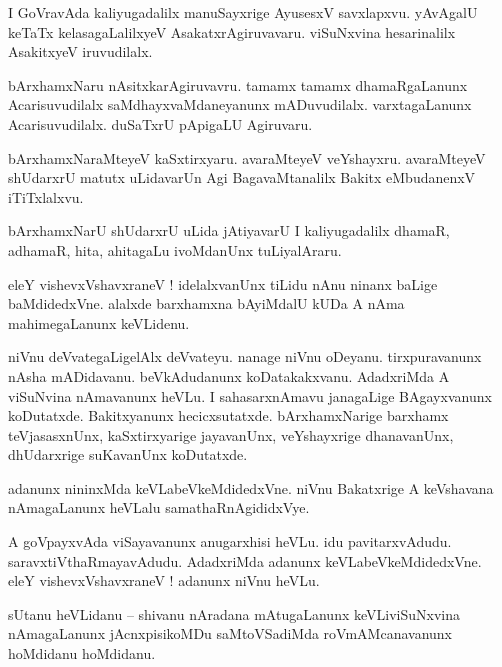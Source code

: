 \documentclass{article}
\begin{document}
\begin{mn}%
I GoVravAda kaliyugadalilx manuSayxrige AyusesxV savxlapxvu. yAvAgalU keTaTx kelasagaLalilxyeV 
AsakatxrAgiruvavaru. viSuNxvina hesarinalilx AsakitxyeV iruvudilalx.
\end{mn}

\begin{mn}%
bArxhamxNaru nAsitxkarAgiruvavru. tamamx tamamx dhamaRgaLanunx Acarisuvudilalx 
saMdhayxvaMdaneyanunx mADuvudilalx. varxtagaLanunx Acarisuvudilalx. duSaTxrU pApigaLU Agiruvaru.
\end{mn}

\begin{mn}%
bArxhamxNaraMteyeV kaSxtirxyaru. avaraMteyeV veYshayxru. avaraMteyeV shUdarxrU matutx uLidavarUn 
Agi BagavaMtanalilx Bakitx eMbudanenxV iTiTxlalxvu.
\end{mn}

\begin{mn}%
bArxhamxNarU shUdarxrU uLida jAtiyavarU I kaliyugadalilx dhamaR, adhamaR, hita, ahitagaLu 
ivoMdanUnx tuLiyalAraru.
\end{mn}

\begin{mn}%
eleY vishevxVshavxraneV ! idelalxvanUnx tiLidu nAnu ninanx baLige baMdidedxVne. alalxde barxhamxna 
bAyiMdalU kUDa A nAma mahimegaLanunx keVLidenu.
\end{mn}

\begin{mn}%
niVnu deVvategaLigelAlx deVvateyu. nanage niVnu oDeyanu. tirxpuravanunx nAsha mADidavanu. 
beVkAdudanunx koDatakakxvanu. AdadxriMda A viSuNvina nAmavanunx heVLu. I sahasarxnAmavu janagaLige 
BAgayxvanunx koDutatxde. Bakitxyanunx hecicxsutatxde. bArxhamxNarige barxhamx teVjasasxnUnx, 
kaSxtirxyarige jayavanUnx, veYshayxrige dhanavanUnx, dhUdarxrige suKavanUnx koDutatxde.
\end{mn}

\begin{mn}%
adanunx nininxMda keVLabeVkeMdidedxVne. niVnu Bakatxrige A keVshavana nAmagaLanunx heVLalu 
samathaRnAgididxVye.
\end{mn}

\begin{mn}%
A goVpayxvAda viSayavanunx anugarxhisi heVLu. idu pavitarxvAdudu. saravxtiVthaRmayavAdudu. 
AdadxriMda adanunx keVLabeVkeMdidedxVne. eleY vishevxVshavxraneV ! adanunx niVnu heVLu.
\end{mn}

\begin{mn}%
sUtanu heVLidanu -- shivanu nAradana mAtugaLanunx keVLiviSuNxvina nAmagaLanunx jAcnxpisikoMDu 
saMtoVSadiMda roVmAMcanavanunx hoMdidanu hoMdidanu. 
\end{mn}
\end{document}
